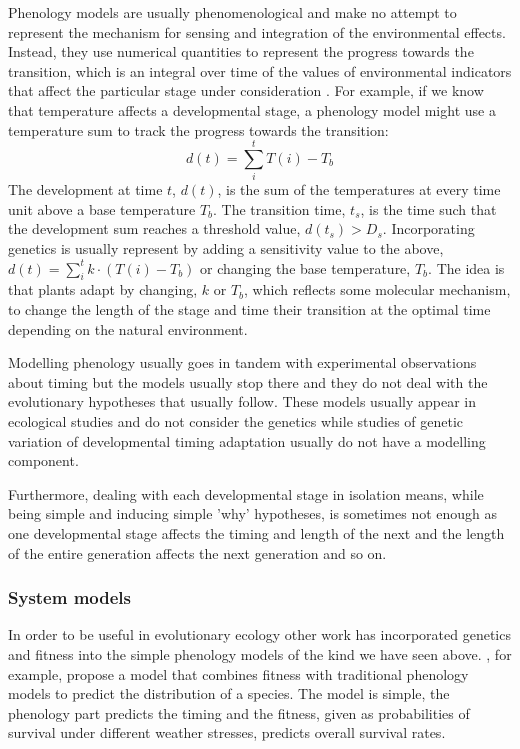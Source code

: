 Phenology models are usually phenomenological and make no attempt to represent
the mechanism for sensing and integration of the environmental effects. Instead,
they use numerical quantities to represent the progress towards the transition,
which is an integral over time of the values of environmental indicators that
affect the particular stage under consideration \citep{chuine_plant_2013}. For
example, if we know that temperature affects a developmental stage, a phenology
model might use a temperature sum to track the progress towards the transition:
$$
d(t) = \sum_{i}^{t} T(i) - T_b
$$
The development at time $t$, $d(t)$, is the sum of the temperatures at every
time unit above a base temperature $T_b$. The transition time, $t_s$, is the
time such that the development sum reaches a threshold value, $d(t_s) >
D_s$. Incorporating genetics is usually represent by adding a sensitivity value
to the above, $ d(t) = \sum_{i}^{t} k \cdot (T(i) - T_b)$ or changing the base temperature,
$T_b$. The idea is that plants adapt by changing, $k$ or $T_b$, which reflects
some molecular mechanism, to change the length of the stage and time their
transition at the optimal time depending on the natural environment.

Modelling phenology usually goes in tandem with experimental observations about
timing but the models usually stop there and they do not deal with the
evolutionary hypotheses that usually follow. These models usually appear in
ecological studies and do not consider the genetics while studies of genetic
variation of developmental timing adaptation usually do not have a modelling
component.

Furthermore, dealing with each developmental stage in isolation means, while
being simple and inducing simple 'why' hypotheses, is sometimes not enough as one
developmental stage affects the timing and length of the next and the length of
the entire generation affects the next generation and so on.

\subsubsection*{System models}
In order to be useful in evolutionary ecology other work has incorporated
genetics and fitness into the simple phenology models of the kind we have seen
above. \citet{chuine_phenology_2001}, for example, propose a model that combines
fitness with traditional phenology models to predict the distribution of a
species. The model is simple, the phenology part predicts the timing and the
fitness, given as probabilities of survival under different weather stresses,
predicts overall survival rates.

